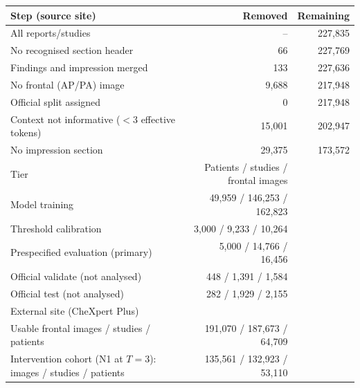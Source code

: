 \begin{tabular}{lrr}
\toprule
Step (source site) & Removed & Remaining\\
\midrule
All reports/studies & -- & 227,835\\
No recognised section header & 66 & 227,769\\
Findings and impression merged & 133 & 227,636\\
No frontal (AP/PA) image & 9,688 & 217,948\\
Official split assigned & 0 & 217,948\\
Context not informative ($<3$ effective tokens) & 15,001 & 202,947\\
No impression section & 29,375 & 173,572\\
\midrule
Tier & Patients / studies / frontal images & \\
Model training & 49,959 / 146,253 / 162,823 & \\
Threshold calibration & 3,000 / 9,233 / 10,264 & \\
Prespecified evaluation (primary) & 5,000 / 14,766 / 16,456 & \\
Official validate (not analysed) & 448 / 1,391 / 1,584 & \\
Official test (not analysed) & 282 / 1,929 / 2,155 & \\
\midrule
External site (CheXpert Plus) & & \\
Usable frontal images / studies / patients & 191,070 / 187,673 / 64,709 & \\
Intervention cohort (N1 at $T=3$): images / studies / patients & 135,561 / 132,923 / 53,110 & \\
\bottomrule
\end{tabular}
